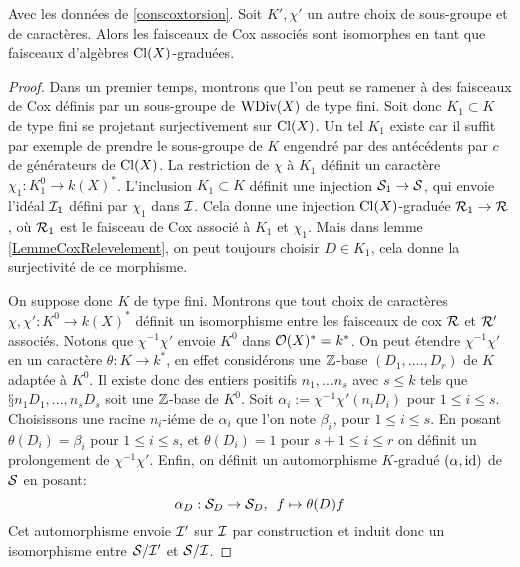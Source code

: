 \begin{thm}\label{InvarianceCoxTorsion}
Avec les données de \ref{conscoxtorsion}. Soit $K', \chi'$ un autre choix de sous-groupe et de caractères. Alors les faisceaux de Cox associés sont isomorphes en tant que faisceaux d'algèbres $\operatorname{Cl}(X)$-graduées.
\end{thm}
\begin{proof}
Dans un premier temps, montrons que l'on peut se ramener à des faisceaux de Cox définis par un sous-groupe de $\operatorname{WDiv}(X)$ de type fini. Soit donc $K_1\subset K$ de type fini se projetant surjectivement sur $\operatorname{Cl}(X)$. Un tel $K_1$ existe car il suffit par exemple de prendre le sous-groupe de $K$ engendré par des antécédents par $c$ de générateurs de $\operatorname{Cl}(X)$. La restriction de $\chi$ à $K_1$ définit un caractère $\chi_1:K_1^0\rightarrow k(X)^*$. L'inclusion $K_1\subset K$ définit une injection $\mathcal{S}_1\rightarrow \mathcal{S}$, qui envoie l'idéal $\mathcal{I}_1$ défini par $\chi_1$ dans $\mathcal{I}$. Cela donne une injection $\operatorname{Cl}(X)$-graduée $\mathcal{R}_1\rightarrow \mathcal{R}$, où $\mathcal{R}_1$ est le faisceau de Cox associé à $K_1$ et $\chi_1$. Mais dans lemme \ref{LemmeCoxRelevelement}, on peut toujours choisir $D\in K_1$, cela donne la surjectivité de ce morphisme.

On suppose donc $K$ de type fini. Montrons que tout choix de caractères $\chi,\chi':K^0\rightarrow k(X)^*$ définit un isomorphisme entre les faisceaux de cox $\mathcal{R}$ et $\mathcal{R}'$ associés. Notons que $\chi^{-1}\chi'$ envoie $K^0$ dans $\mathcal{O}(X)^*=k^*$. On peut étendre $\chi^{-1}\chi'$ en un caractère $\theta:K\rightarrow k^*$, en effet considérons une $\mathbb{Z}$-base $(D_1,....,D_r)$ de $K$ adaptée à $K^0$. Il existe donc des entiers positifs $n_1,...n_s$ avec $s\leq k$ tels que $§n_1D_1,...,n_sD_s$ soit une $\mathbb{Z}$-base de $K^0$. Soit $\alpha_i := \chi^{-1}\chi'(n_iD_i)$ pour $1\leq i\leq s$. Choisissons une racine $n_i$-iéme de $\alpha_i$ que l'on note $\beta_i$, pour $1\leq i\leq s$. En posant $\theta(D_i)=\beta_i$ pour $1\leq i\leq s$, et $\theta(D_i)=1$ pour $s+1\leq i\leq r$ on définit un prolongement de $\chi^{-1}\chi'$. Enfin, on définit un automorphisme $K$-gradué $(\alpha,\operatorname{id})$ de $\mathcal{S}$ en posant:
$$\alpha_D:\mathcal{S}_D\rightarrow \mathcal{S}_D,\,\,\, f\mapsto \theta(D)f$$
Cet automorphisme envoie $\mathcal{I}'$ sur $\mathcal{I}$ par construction et induit donc un isomorphisme entre $\mathcal{S}/\mathcal{I}'$ et $\mathcal{S}/\mathcal{I}$.


\end{proof}
